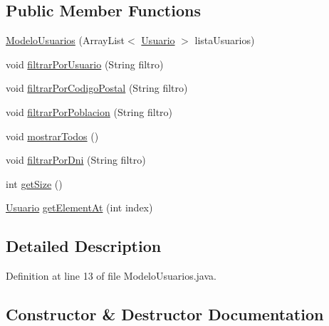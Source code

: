 \subsection*{Public Member Functions}
\begin{DoxyCompactItemize}
\item 
\mbox{\hyperlink{classmodelos_1_1_modelo_usuarios_a29eb753e9f246c911e679e28a7ba7173}{Modelo\+Usuarios}} (Array\+List$<$ \mbox{\hyperlink{classobjetos_1_1_usuario}{Usuario}} $>$ lista\+Usuarios)
\item 
void \mbox{\hyperlink{classmodelos_1_1_modelo_usuarios_a43fe9d71b2cb14a67af32df76c93f1ec}{filtrar\+Por\+Usuario}} (String filtro)
\item 
void \mbox{\hyperlink{classmodelos_1_1_modelo_usuarios_a32302d42fef716e596f45c6ed27a3641}{filtrar\+Por\+Codigo\+Postal}} (String filtro)
\item 
void \mbox{\hyperlink{classmodelos_1_1_modelo_usuarios_aa19c41161c68beb4f84f553bd3cca8b3}{filtrar\+Por\+Poblacion}} (String filtro)
\item 
void \mbox{\hyperlink{classmodelos_1_1_modelo_usuarios_a319bbe3d654caccba263e75ae64e9f37}{mostrar\+Todos}} ()
\item 
void \mbox{\hyperlink{classmodelos_1_1_modelo_usuarios_a65777b1abda04e3dd05762d1e5a4cc1d}{filtrar\+Por\+Dni}} (String filtro)
\item 
int \mbox{\hyperlink{classmodelos_1_1_modelo_usuarios_a35b3ac033cacc65073296b297d92eb0b}{get\+Size}} ()
\item 
\mbox{\hyperlink{classobjetos_1_1_usuario}{Usuario}} \mbox{\hyperlink{classmodelos_1_1_modelo_usuarios_ae477676a4f06527dc6f70b160ab5f426}{get\+Element\+At}} (int index)
\end{DoxyCompactItemize}


\subsection{Detailed Description}


Definition at line 13 of file Modelo\+Usuarios.\+java.



\subsection{Constructor \& Destructor Documentation}
\mbox{\label{classmodelos_1_1_modelo_usuarios_a29eb753e9f246c911e679e28a7ba7173}} 
